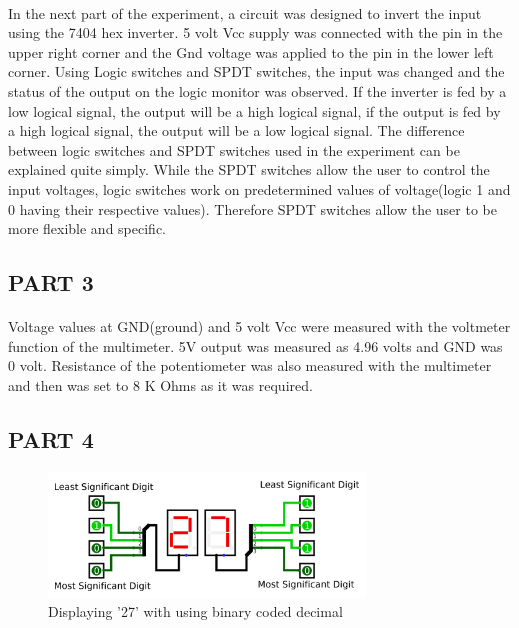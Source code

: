 \documentclass[pdftex,12pt,a4paper]{article}
\begin{document}
\begin{flushleft}
\paragraph{}
In the next part of the experiment, a circuit was designed to invert the input using the 7404 hex inverter. 5 volt Vcc supply was connected with the pin in the upper right corner and the Gnd voltage was applied to the pin in the lower left corner. Using Logic switches and SPDT switches, the input was changed and the status of the output on the logic monitor was observed. If the inverter is fed by a low logical signal, the output will be a high logical signal, if the output is fed by a high logical signal, the output will be a low logical signal. The difference between logic switches and SPDT switches used in the experiment can be explained quite simply. While the SPDT switches allow the user to control the input voltages, logic switches work on predetermined values of voltage(logic 1 and 0 having their respective values). Therefore SPDT switches allow the user to be more flexible and specific.
\end{flushleft}



\begin{flushleft}
\subsection{PART 3}
\end{flushleft}
\begin{flushleft}
\paragraph{}
Voltage values at GND(ground) and 5 volt Vcc were measured with the voltmeter function of the multimeter. 5V output was measured as 4.96 volts and GND was 0 volt. Resistance of the potentiometer was also measured with the multimeter and then was set to 8 K Ohms as it was required.
\end{flushleft}

\begin{flushleft}
\subsection{PART 4}
\end{flushleft}

\begin{figure}[ht]
	\centering
	\includegraphics[width=0.75\textwidth]{part4_800.png}	
	\caption{Displaying '27' with using binary coded decimal}
	\label{fig3}
\end{figure}
\end{document}
